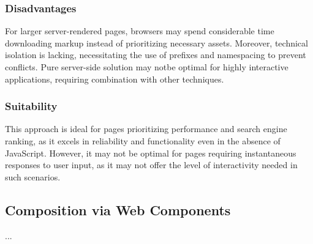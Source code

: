 \subsubsection{Disadvantages}
For larger server-rendered pages, browsers may spend considerable time downloading markup instead of prioritizing necessary assets. Moreover, technical isolation is lacking, necessitating the use of prefixes and namespacing to prevent conflicts. Pure server-side solution may notbe optimal for highly interactive applications, requiring combination with other techniques. \cite{MicrofrontendsInAction}

\subsubsection{Suitability}
This approach is ideal for pages prioritizing performance and search engine ranking, as it excels in reliability and functionality even in the absence of JavaScript. However, it may not be optimal for pages requiring instantaneous responses to user input, as it may not offer the level of interactivity needed in such scenarios. \cite{MicrofrontendsInAction}

\subsection{Composition via Web Components}
...